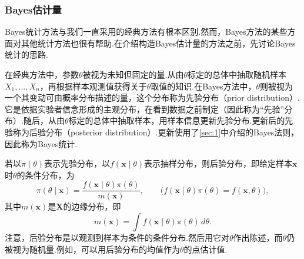 \subsubsection{Bayes估计量}\label{sec:7.2.3}
Bayes统计方法与我们一直采用的经典方法有根本区别.然而，Bayes方法的某些方面对其他统计方法也很有帮助.在介绍构造Bayes估计量的方法之前，先讨论Bayes统计的思路.

在经典方法中，参数$\theta$被视为未知但固定的量.从由$\theta$标定的总体中抽取随机样本$X_1,\ldots,X_n$，再根据样本观测值获得关于$\theta$取值的知识.在Bayes方法中，$\theta$则被视为一个其变动可由概率分布描述的量，这个分布称为先验分布（prior distribution）.它是依据实验者信念形成的主观分布，在看到数据之前制定（因此称为“先验”分布）.随后，从由$\theta$标定的总体中抽取样本，用样本信息更新先验分布.更新后的先验称为后验分布（posterior distribution）.更新使用了\autoref{sec:1}中介绍的Bayes法则，因此称为Bayes统计.

若以$\pi(\theta)$表示先验分布，以$f(\boldsymbol x\mid\theta)$表示抽样分布，则后验分布，即给定样本$\boldsymbol x$时$\theta$的条件分布，为
\begin{equation}\label{eq:7.2.7}
\pi(\theta\mid\boldsymbol x)=\frac{f(\boldsymbol x\mid\theta)\pi(\theta)}{m(\boldsymbol x)},\qquad\bigl(f(\boldsymbol x\mid\theta)\pi(\theta)=f(\boldsymbol x,\theta)\bigr),
\end{equation}
其中$m(\boldsymbol x)$是$\boldsymbol X$的边缘分布，即
\begin{equation}\label{eq:7.2.8}
m(\boldsymbol x)=\int f(\boldsymbol x\mid\theta)\pi(\theta)\,d\theta.
\end{equation}
注意，后验分布是以观测到样本为条件的条件分布.然后用它对$\theta$作出陈述，而$\theta$仍被视为随机量.例如，可以用后验分布的均值作为$\theta$的点估计值.

